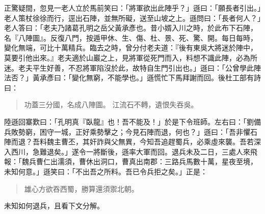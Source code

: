 正驚疑間，忽見一老人立於馬前笑曰：「將軍欲出此陣乎？」遜曰：「願長者引出。」老人策杖徐徐而行，逕出石陣，並無所礙，送至山坡之上。遜問曰：「長者何人？」老人答曰：「老夫乃諸葛孔明之岳父黃承彥也。昔小婿入川之時，於此布下石陣，名『八陣圖』。反復八門，按遁甲休、生、傷、杜、景、死、驚、開。每日每時，變化無端，可比十萬精兵。臨去之時，曾分付老夫道：『後有東吳大將迷於陣中，莫要引他出來。』老夫適於山巖之上，見將軍從死門而入，料想不識此陣，必為所迷。老夫平生好善，不忍將軍陷沒於此，故特自生門引出也。」遜曰：「公曾學此陣法否？」黃承彥曰：「變化無窮，不能學也。」遜慌忙下馬拜謝而回。後杜工部有詩曰：

\begin{quote}
功蓋三分國，名成八陣圖。
江流石不轉，遺恨失吞吳。
\end{quote}

陸遜回寨歎曰：「孔明真『臥龍』也！吾不能及！」於是下令班師。左右曰：「劉備兵敗勢窮，困守一城，正好乘勢擊之；今見石陣而退，何也？」遜曰：「吾非懼石陣而退？吾料魏主曹丕，其奸詐與父無異，今知吾追趕蜀兵，必乘虛來襲。吾若深入西川，急難退矣。」遂令一將斷後，遜率大軍而回。退兵未及二日，三處人來飛報：「魏兵曹仁出濡須，曹休出洞口，曹真出南郡：三路兵馬數十萬，星夜至境，未知何意。」遜笑曰：「不出吾之所料。吾已令兵拒之矣。」正是：

\begin{quote}
雄心方欲吞西蜀，勝算還須禦北朝。
\end{quote}

未知如何退兵，且看下文分解。
